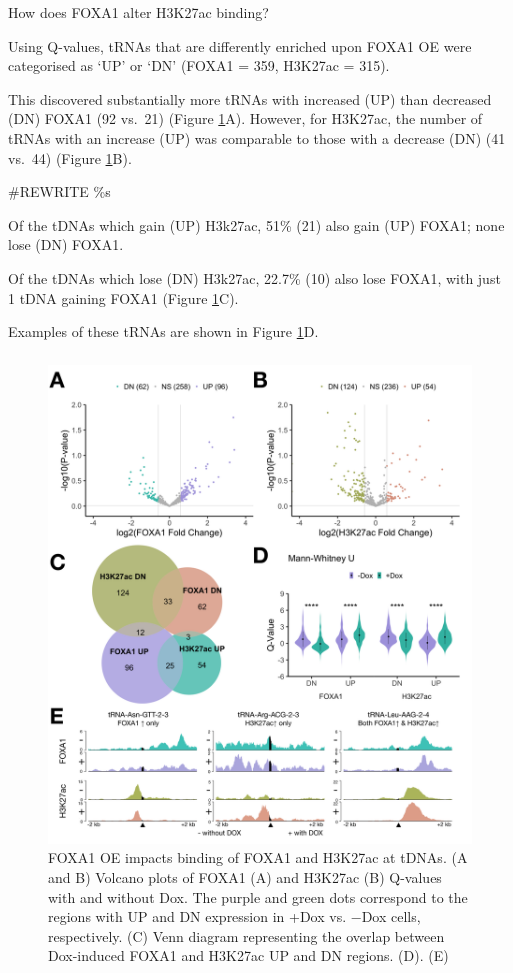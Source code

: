 \documentclass[
  11pt,
]{article}
\begin{document}
How does FOXA1 alter H3K27ac binding?

Using Q-values, tRNAs that are differently enriched upon FOXA1 OE were categorised as `UP' or `DN' (FOXA1 = 359, H3K27ac = 315).

This discovered substantially more tRNAs with increased (UP) than decreased (DN) FOXA1 (92 vs.~21) (Figure \ref{fig:results-2}A).
However, for H3K27ac, the number of tRNAs with an increase (UP) was comparable to those with a decrease (DN) (41 vs.~44) (Figure \ref{fig:results-2}B).

\#REWRITE \%s

Of the tDNAs which gain (UP) H3k27ac, 51\% (21) also gain (UP) FOXA1; none lose (DN) FOXA1.

Of the tDNAs which lose (DN) H3k27ac, 22.7\% (10) also lose FOXA1, with just 1 tDNA gaining FOXA1 (Figure \ref{fig:results-2}C).

Examples of these tRNAs are shown in Figure \ref{fig:results-2}D.

\hypertarget{section}{%
\subsubsection{}\label{section}}

\begin{figure}[H]
\includegraphics[width=1\linewidth]{../images/results-02} \caption{FOXA1 OE impacts binding of FOXA1 and H3K27ac at tDNAs. (A and B) Volcano plots of FOXA1 (A) and H3K27ac (B) Q-values with and without Dox. The purple and green dots correspond to the regions with UP and DN expression in +Dox vs. −Dox cells, respectively. (C) Venn diagram representing the overlap between Dox-induced FOXA1 and H3K27ac UP and DN regions. (D). (E)}\label{fig:results-2}
\end{figure}
\end{document}
